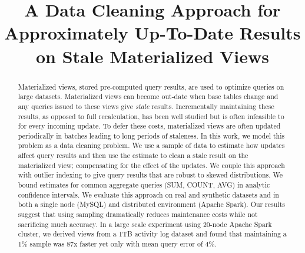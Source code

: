 \documentclass{sig-alternate}
\begin{document}
\newtheorem{theorem}{Theorem}
\newtheorem{example}{Example}
\newtheorem{definition}{Definition}
\newtheorem{proposition}{Proposition}
\newtheorem{lemma}{Lemma}
\newtheorem{corollary}{Corollary}

\newcommand{\dataset}{data set\xspace}
\newcommand{\datasets}{data sets\xspace}
\newcommand{\spview}{\textsf{SPView}\xspace}
\newcommand{\fjview}{\textsf{FJView}\xspace}
\newcommand{\aggview}{\textsf{AggView}\xspace}
\newcommand{\hashfunc}[1]{\textsf{hashfunc}(#1)\xspace}

\newcommand{\tbl}[1]{\textsf{#1}\xspace}
\newcommand{\field}[1]{\textsf{#1}\xspace}
\newcommand{\cost}{\textrm{cost}\xspace}

\newcommand{\reminder}[1]{{{\textcolor{red}{\{\{\bf #1\}\}}}\xspace}}
\newcommand{\specialcell}[2][c]{%
  \begin{tabular}[#1]{@{}c@{}}#2\end{tabular}}

\pagestyle{plain}

\title{A Data Cleaning Approach for Approximately Up-To-Date Results on Stale Materialized Views}

\maketitle

\begin{abstract}
Materialized views, stored pre-computed query results, are used to optimize queries on large datasets.
Materialized views can become out-date when base tables change and any queries issued to these views give \emph{stale} results.
Incrementally maintaining these results, as opposed to full recalculation, has been well studied but is often infeasible to for every incoming update.
To defer these costs, materialized views are often updated periodically in batches leading to long periods of staleness.
In this work, we model this problem as a data cleaning problem.
We use a sample of data to estimate how updates affect query results and then use the estimate to clean a stale result on the materialized view; compensating for the effect of the updates.
We couple this approach with outlier indexing to give query results that are robust to skewed distributions. 
We bound estimates for common aggregate queries (SUM, COUNT, AVG) in analytic confidence intervals.
We evaluate this approach on real and synthetic datasets and in both a single node (MySQL) and distributed environment (Apache Spark).
Our results suggest that using sampling dramatically reduces maintenance costs while not sacrificing much accuracy.
In a large scale experiment using 20-node Apache Spark cluster, we derived views from a 1TB activity log dataset and found that maintaining a 1\% sample was 87x faster yet only with mean query error of 4\%.
\end{abstract}












\fontsize{6.8pt}{6.7pt} \selectfont

 
\end{document}
